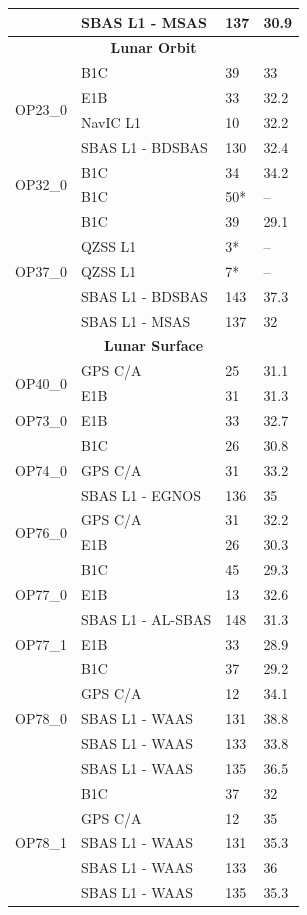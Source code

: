 \documentclass{IEEEtaes}
\begin{document}
\begin{table}[]
\begin{minipage}{0.48\textwidth}
\begin{tabular}{llll}
 & SBAS L1 - MSAS    & 137 & 30.9 \\
\midrule
\multicolumn{4}{c}{\textbf{Lunar Orbit}} \\
\hline
\multirow{4}{*}{OP23\_0}
 & B1C     & 39  & 33 \\
 & E1B     & 33  & 32.2\\
 & NavIC L1 & 10 & 32.2\\
 & SBAS L1 - BDSBAS  & 130 & 32.4 \\
\midrule
\multirow{2}{*}{OP32\_0}
 & B1C     & 34  & 34.2 \\
 & B1C & 50* & -- \\
\midrule
\multirow{5}{*}{OP37\_0}
 & B1C     & 39  & 29.1 \\
 & QZSS L1  & 3* & -- \\
 & QZSS L1  & 7* & -- \\
 & SBAS L1 - BDSBAS  & 143 & 37.3 \\
 & SBAS L1 - MSAS    & 137 & 32 \\
\midrule
\multicolumn{4}{c}{\textbf{Lunar Surface}} \\
\hline
\multirow{2}{*}{OP40\_0}
 & GPS C/A & 25  & 31.1 \\
 & E1B     & 31  & 31.3 \\
\midrule
\multirow{1}{*}{OP73\_0}
 & E1B     & 33  & 32.7 \\
\midrule
\multirow{3}{*}{OP74\_0}
 & B1C     & 26  & 30.8 \\
 & GPS C/A & 31  & 33.2 \\
 & SBAS L1 - EGNOS  & 136 & 35 \\
\midrule
\multirow{2}{*}{OP76\_0}
 & GPS C/A & 31  & 32.2 \\
 & E1B     & 26  & 30.3 \\
\midrule
\multirow{3}{*}{OP77\_0}
 & B1C   & 45  & 29.3 \\
 & E1B   & 13  & 32.6 \\
 & SBAS L1 - AL-SBAS & 148 & 31.3 \\
\midrule
\multirow{1}{*}{OP77\_1}
 & E1B & 33 & 28.9 \\

\midrule
\multirow{5}{*}{OP78\_0}
 & B1C & 37  & 29.2 \\
 & GPS C/A & 12 & 34.1 \\
 & SBAS L1 - WAAS & 131 & 38.8 \\
 & SBAS L1 - WAAS & 133 & 33.8 \\
 & SBAS L1 - WAAS & 135 & 36.5 \\
\midrule
\multirow{5}{*}{OP78\_1}
 & B1C & 37 & 32 \\
 & GPS C/A & 12 & 35 \\
 & SBAS L1 - WAAS & 131 & 35.3 \\
 & SBAS L1 - WAAS & 133 & 36 \\
 & SBAS L1 - WAAS & 135 & 35.3 \\
\midrule
\hline


\end{tabular}
\end{minipage}
\end{table}
\end{document}
